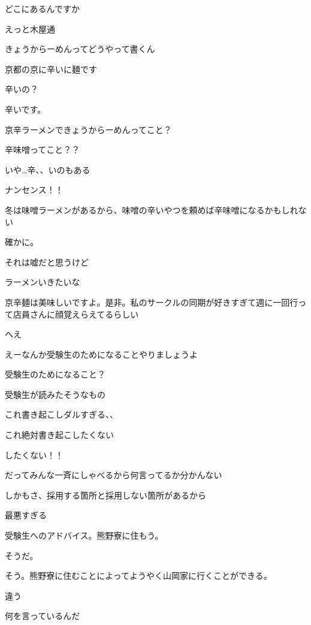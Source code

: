\begin{multicols}{3}
どこにあるんですか

えっと木屋通

きょうからーめんってどうやって書くん

京都の京に辛いに麺です

辛いの？

辛いです。

京辛ラーメンできょうからーめんってこと？

辛味噌ってこと？？

いや…辛、、いのもある

ナンセンス！！

冬は味噌ラーメンがあるから、味噌の辛いやつを頼めば辛味噌になるかもしれない

確かに。

それは嘘だと思うけど

ラーメンいきたいな

京辛麺は美味しいですよ。是非。私のサークルの同期が好きすぎて週に一回行って店員さんに顔覚えらえてるらしい

 へえ

\vspace{5mm}


\noindent{}

えーなんか受験生のためになることやりましょうよ

受験生のためになること？

受験生が読みたそうなもの

これ書き起こしダルすぎる、、

これ絶対書き起こしたくない

したくない！！

だってみんな一斉にしゃべるから何言ってるか分かんない

しかもさ、採用する箇所と採用しない箇所があるから

最悪すぎる

受験生へのアドバイス。熊野寮に住もう。

そうだ。

そう。熊野寮に住むことによってようやく山岡家に行くことができる。

違う

何を言っているんだ


\end{multicols}
